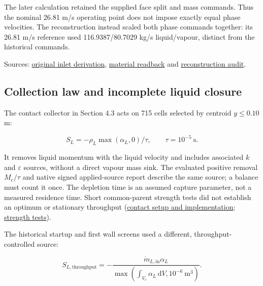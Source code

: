 \documentclass[12pt]{article}
\begin{document}
The later calculation retained the supplied face split and mass commands. Thus the nominal 26.81 m/s operating point does not impose exactly equal phase velocities. The reconstruction instead scaled both phase commands together: its 26.81 m/s reference used 116.9387/80.7029 kg/s liquid/vapour, distinct from the historical commands.

Sources: \href{draft/../../../experiments/phase-02-parity-reset-and-pre-v2-qualification/purnanto-08c-inlet-loading-sensitivity/inlet-regimes-interpretation.md}{original inlet derivation}, \href{draft/../../../experiments/phase-07-1a-absorber-convergence/baseline-v2-virtual-liquid-outlet/build-manifest.json}{material readback} and \href{draft/../../../experiments/phase-08-storyline-reconstruction/stage-01-60k-storyline/baseline-lineage-audit.md}{reconstruction audit}.

\subsection{Collection law and incomplete liquid closure}\label{a.3.-collection-law-and-incomplete-liquid-closure}

The contact collector in Section 4.3 acts on 715 cells selected by centroid \(y\leq0.10\) m:

\[
S_L=-\rho_L\max(\alpha_L,0)/\tau,\qquad \tau=10^{-5}\ \mathrm{s}.
\]

It removes liquid momentum with the liquid velocity and includes associated \(k\) and \(\varepsilon\) sources, without a direct vapour mass sink. The evaluated positive removal \(M_c/\tau\) and native signed applied-source report describe the same source; a balance must count it once. The depletion time is an assumed capture parameter, not a measured residence time. Short common-parent strength tests did not establish an optimum or stationary throughput (\href{draft/../../../experiments/phase-07-2a-wall-liquid-routing/stage-02-combined-ewf-roughness/ewf-absorber/setup.md}{contact setup and implementation}; \href{draft/../../../experiments/phase-07-2a-wall-liquid-routing/stage-02-combined-ewf-roughness/results.md\#all-liquid-contact-absorber-trial}{strength tests}).

The historical startup and first wall screens used a different, throughput-controlled source:

\[
S_{L,\mathrm{throughput}}=-\frac{\dot m_{L,\mathrm{in}}\alpha_L}
{\max(\int_{V_c}\alpha_L\,\mathrm dV,10^{-6}\ \mathrm{m^3})}.
\]
\end{document}
